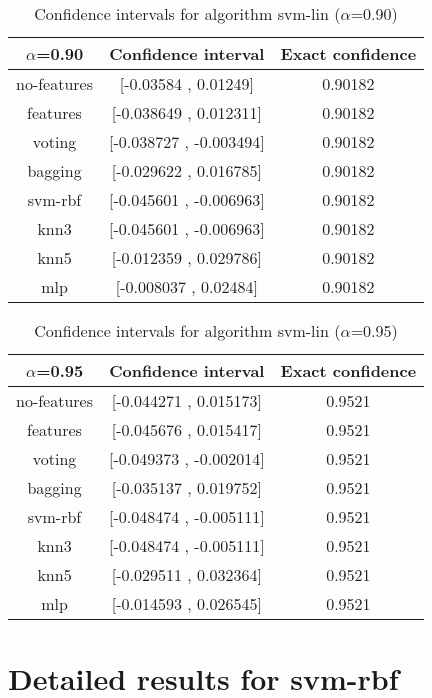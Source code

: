 \documentclass[a4paper,10pt]{article}
\begin{document}
\begin{table}[!htp]
\centering\small
\begin{tabular}{
|c|c|c|}
\hline
 $\alpha$=0.90 & Confidence interval & Exact confidence \\ \hline 
no-features & [-0.03584 , 0.01249] & 0.90182\\ \hline 
features & [-0.038649 , 0.012311] & 0.90182\\ \hline 
voting & [-0.038727 , -0.003494] & 0.90182\\ \hline 
bagging & [-0.029622 , 0.016785] & 0.90182\\ \hline 
svm-rbf & [-0.045601 , -0.006963] & 0.90182\\ \hline 
knn3 & [-0.045601 , -0.006963] & 0.90182\\ \hline 
knn5 & [-0.012359 , 0.029786] & 0.90182\\ \hline 
mlp & [-0.008037 , 0.02484] & 0.90182\\ \hline 

\end{tabular}
\caption{Confidence intervals for algorithm svm-lin ($\alpha$=0.90)}
\end{table}
\begin{table}[!htp]
\centering\small
\begin{tabular}{
|c|c|c|}
\hline
 $\alpha$=0.95 & Confidence interval & Exact confidence \\ \hline 
no-features & [-0.044271 , 0.015173] & 0.9521\\ \hline 
features & [-0.045676 , 0.015417] & 0.9521\\ \hline 
voting & [-0.049373 , -0.002014] & 0.9521\\ \hline 
bagging & [-0.035137 , 0.019752] & 0.9521\\ \hline 
svm-rbf & [-0.048474 , -0.005111] & 0.9521\\ \hline 
knn3 & [-0.048474 , -0.005111] & 0.9521\\ \hline 
knn5 & [-0.029511 , 0.032364] & 0.9521\\ \hline 
mlp & [-0.014593 , 0.026545] & 0.9521\\ \hline 

\end{tabular}
\caption{Confidence intervals for algorithm svm-lin ($\alpha$=0.95)}
\end{table}

 \clearpage 


\section{Detailed results for svm-rbf}
\end{document}
